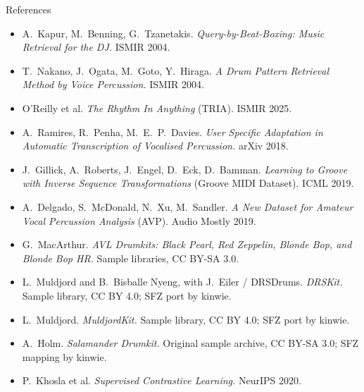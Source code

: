 \begin{frame}{References}
  \scriptsize
  \begin{itemize}
    \item A.~Kapur, M.~Benning, G.~Tzanetakis. \emph{Query-by-Beat-Boxing: Music Retrieval for the DJ.} ISMIR 2004.
    \item T.~Nakano, J.~Ogata, M.~Goto, Y.~Hiraga. \emph{A Drum Pattern Retrieval Method by Voice Percussion.} ISMIR 2004.
    \item O'Reilly et al. \emph{The Rhythm In Anything} (TRIA). ISMIR 2025.
    \item A.~Ramires, R.~Penha, M.~E.~P.~Davies. \emph{User Specific Adaptation in Automatic Transcription of Vocalised Percussion.} arXiv 2018.

    \item J.~Gillick, A.~Roberts, J.~Engel, D.~Eck, D.~Bamman.
      \emph{Learning to Groove with Inverse Sequence Transformations}
      (Groove MIDI Dataset). ICML 2019.
    
    \item A.~Delgado, S.~McDonald, N.~Xu, M.~Sandler.
      \emph{A New Dataset for Amateur Vocal Percussion Analysis}
      (AVP). Audio Mostly 2019.
    
    \item G.~MacArthur.
      \emph{AVL Drumkits: Black Pearl, Red Zeppelin,
      Blonde Bop, and Blonde Bop HR.}
      Sample libraries, CC BY-SA 3.0.
    
    \item L.~Muldjord and B.~Bisballe Nyeng,
      with J.~Eiler / DRSDrums.
      \emph{DRSKit.}
      Sample library, CC BY 4.0;
      SFZ port by kinwie.
    
    \item L.~Muldjord.
      \emph{MuldjordKit.}
      Sample library, CC BY 4.0;
      SFZ port by kinwie.
    
    \item A.~Holm.
      \emph{Salamander Drumkit.}
      Original sample archive, CC BY-SA 3.0;
      SFZ mapping by kinwie.

    \item P.~Khosla et al. \emph{Supervised Contrastive Learning.} NeurIPS 2020.


\end{itemize}
\end{frame}
